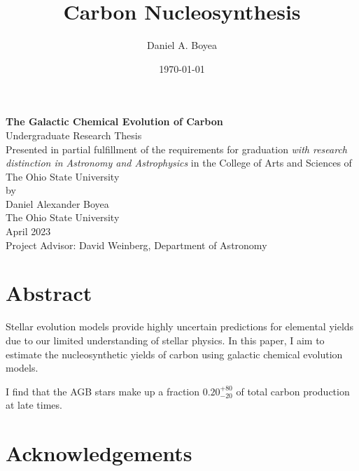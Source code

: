 \documentclass[12pt,oneside]{report}
\title{Carbon Nucleosynthesis}
\author{Daniel A. Boyea}
\date{\today}
\begin{document}


\begin{titlepage}
   \begin{center}
       \vspace*{5\baselineskip}
       \textbf{The Galactic Chemical Evolution of Carbon} \\
       \vspace*{3\baselineskip}
        Undergraduate Research Thesis\\
       \vspace*{3\baselineskip}
    Presented in partial fulfillment of the requirements for graduation \textit{with research distinction in Astronomy and Astrophysics} in the College of Arts and Sciences of The Ohio State University \\
       \vspace*{3\baselineskip}
        by \\
       \vspace*{3\baselineskip}
       {Daniel Alexander Boyea}\\
       \vspace*{3\baselineskip}
       The Ohio State University\\
       April 2023\\
       \vspace*{3\baselineskip}
       Project Advisor: David Weinberg, Department of Astronomy
       \vfill
   \end{center}
\end{titlepage}



\chapter*{Abstract}
Stellar evolution models provide highly uncertain predictions for elemental yields due to our limited understanding of stellar physics. In this paper, I aim to estimate the nucleosynthetic yields of carbon using galactic chemical evolution models. 

I find that the AGB stars make up a fraction $0.20_{-20}^{+80}$ of total carbon production at late times. 

\chapter*{Acknowledgements}
\end{document}
